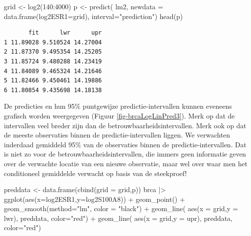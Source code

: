 \documentclass[
  dutch,
  letterpaper,
  12pt]{book}
\newenvironment{Shaded}{\begin{snugshade}}{\end{snugshade}}
\newcommand{\AttributeTok}[1]{\textcolor[rgb]{0.40,0.45,0.13}{#1}}
\newcommand{\DecValTok}[1]{\textcolor[rgb]{0.68,0.00,0.00}{#1}}
\newcommand{\FunctionTok}[1]{\textcolor[rgb]{0.28,0.35,0.67}{#1}}
\newcommand{\NormalTok}[1]{\textcolor[rgb]{0.00,0.23,0.31}{#1}}
\newcommand{\OtherTok}[1]{\textcolor[rgb]{0.00,0.23,0.31}{#1}}
\newcommand{\SpecialCharTok}[1]{\textcolor[rgb]{0.37,0.37,0.37}{#1}}
\newcommand{\StringTok}[1]{\textcolor[rgb]{0.13,0.47,0.30}{#1}}
\theoremstyle{definition}
\theoremstyle{definition}
\theoremstyle{definition}
\theoremstyle{remark}
\begin{document}
\begin{Shaded}
\begin{Highlighting}[]
\NormalTok{grid }\OtherTok{\textless{}{-}} \FunctionTok{log2}\NormalTok{(}\DecValTok{140}\SpecialCharTok{:}\DecValTok{4000}\NormalTok{)}
\NormalTok{p }\OtherTok{\textless{}{-}} \FunctionTok{predict}\NormalTok{(}
\NormalTok{  lm2,}
  \AttributeTok{newdata =} \FunctionTok{data.frame}\NormalTok{(}\AttributeTok{log2ESR1=}\NormalTok{grid),}
  \AttributeTok{interval=}\StringTok{"prediction"}\NormalTok{)}
\FunctionTok{head}\NormalTok{(p)}
\end{Highlighting}
\end{Shaded}

\begin{verbatim}
       fit      lwr      upr
1 11.89028 9.510524 14.27004
2 11.87370 9.495354 14.25205
3 11.85724 9.480288 14.23419
4 11.84089 9.465324 14.21646
5 11.82466 9.450461 14.19886
6 11.80854 9.435698 14.18138
\end{verbatim}

De predicties en hun 95\% puntgewijze predictie-intervallen kunnen
eveneens grafisch worden weergegeven (Figuur \ref{fig-brcaLogLinPred3}).
Merk op dat de intervallen veel breder zijn dan de
betrouwbaarheidsintervallen. Merk ook op dat de meeste observaties
binnen de predictie-intervallen liggen. We verwachten inderdaad
gemiddeld 95\% van de observaties binnen de predictie-intervallen. Dat
is niet zo voor de betrouwbaarheidsintervallen, die immers geen
informatie geven over de verwachte locatie van een nieuwe observatie,
maar wel over waar men het conditioneel gemiddelde verwacht op basis van
de steekproef!

\begin{Shaded}
\begin{Highlighting}[]
\NormalTok{preddata }\OtherTok{\textless{}{-}} \FunctionTok{data.frame}\NormalTok{(}\FunctionTok{cbind}\NormalTok{(}\AttributeTok{grid =}\NormalTok{ grid,p))}
\NormalTok{brca }\SpecialCharTok{|\textgreater{}} \FunctionTok{ggplot}\NormalTok{(}\FunctionTok{aes}\NormalTok{(}\AttributeTok{x=}\NormalTok{log2ESR1,}\AttributeTok{y=}\NormalTok{log2S100A8)) }\SpecialCharTok{+}
  \FunctionTok{geom\_point}\NormalTok{() }\SpecialCharTok{+}
  \FunctionTok{geom\_smooth}\NormalTok{(}\AttributeTok{method=}\StringTok{"lm"}\NormalTok{, }\AttributeTok{color =} \StringTok{"black"}\NormalTok{) }\SpecialCharTok{+}
  \FunctionTok{geom\_line}\NormalTok{(}
    \FunctionTok{aes}\NormalTok{(}\AttributeTok{x =}\NormalTok{ grid,}\AttributeTok{y =}\NormalTok{ lwr),}
\NormalTok{    preddata,}
    \AttributeTok{color=}\StringTok{"red"}\NormalTok{) }\SpecialCharTok{+}
  \FunctionTok{geom\_line}\NormalTok{(}
    \FunctionTok{aes}\NormalTok{(}\AttributeTok{x =}\NormalTok{ grid,}\AttributeTok{y =}\NormalTok{ upr),}
\NormalTok{    preddata,}
    \AttributeTok{color=}\StringTok{"red"}\NormalTok{)}
\end{Highlighting}
\end{Shaded}
\end{document}
